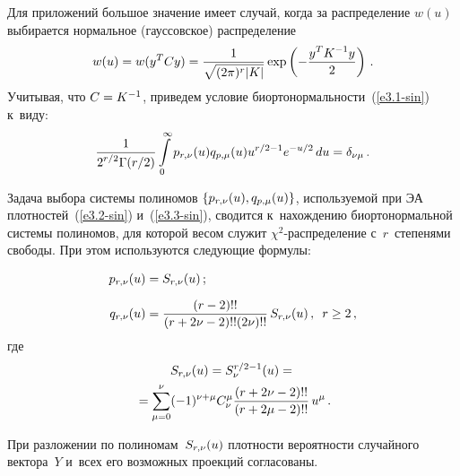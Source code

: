 \begin{multicols}{2}
Для приложений большое значение имеет случай, когда за
распределение $w(u)$ выбирается нормальное (гауссовское) распределение
\begin{equation*}
w(u)=w(y^TCy)=\fr{1}{\sqrt{(2\pi)^r\vert
    K\vert}}\exp\left(-\fr{y^TK^{-1}y}{2}\right)\,. %
    \end{equation*}
Учитывая, что $C\hm=K^{-1}$, приведем условие биортонормальности~(\ref{e3.1-sin}) к~виду:
    \begin{equation*}
    \displaystyle\frac{\displaystyle 1\mathstrut}{\displaystyle 2^{r/2}\Gamma(r/2)\mathstrut}\int\limits_0^{\infty}
    p_{r,\nu}(u)q_{p,\mu}(u)u^{r/2-1}e^{-u/2}\,du=\delta_{\nu\mu}\,.
\end{equation*}

 Задача выбора системы полиномов $\{p_{r,\nu}(u),q_{p,\mu}(u)\}$,
используемой при ЭА плотностей~(\ref{e3.2-sin})
и~(\ref{e3.3-sin}), сводится к~нахождению биортонормальной системы
полиномов, для которой весом служит $\chi^2$-рас\-пре\-де\-ле\-ние 
с~$r$~степенями свободы. При этом используются следующие формулы:

\noindent
\begin{align*}
p_{r,\nu}(u)&=S_{r,\nu}(u)\,;\\[6pt] 
q_{r,\nu}(u)&=\displaystyle\frac{\displaystyle (r-2)!!\mathstrut}{\displaystyle (r+2\nu-2)!!(2\nu)!!\mathstrut}\,S_{r,\nu}(u)\,,
    \enskip r\ge 2\,,
    \end{align*}
    где
   \begin{multline*}
S_{r,\nu}(u)=S_{\nu}^{r/2-1}(u)={}\\
{}=\sum\limits_{\mu=0}^{\nu}(-1)^{\nu+\mu}
    C_{\nu}^{\mu}\displaystyle\frac{\displaystyle (r+2\nu-2)!!\mathstrut}{\displaystyle (r+2\mu-2)!!\mathstrut}\,u^{\mu}\,.
    \end{multline*}
    
    \vspace*{-8pt}

При разложении по полиномам~$S_{r,\nu}(u)$ плот\-ности вероятности
случайного вектора~$Y$ и~всех его возможных проекций согласованы.


\end{multicols}
